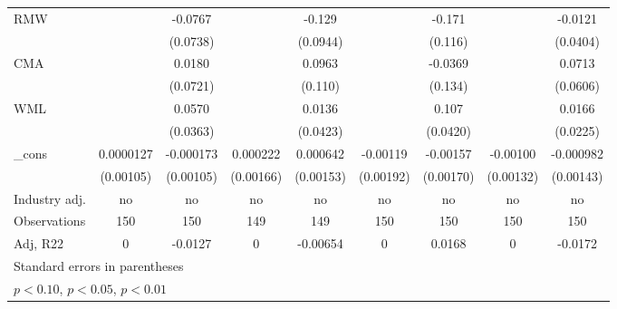 {\begin{tabular}{l*{8}{c}}
RMW                 &                     &     -0.0767         &                     &      -0.129         &                     &      -0.171         &                     &     -0.0121         \\
                    &                     &    (0.0738)         &                     &    (0.0944)         &                     &     (0.116)         &                     &    (0.0404)         \\
CMA                 &                     &      0.0180         &                     &      0.0963         &                     &     -0.0369         &                     &      0.0713         \\
                    &                     &    (0.0721)         &                     &     (0.110)         &                     &     (0.134)         &                     &    (0.0606)         \\
WML                 &                     &      0.0570         &                     &      0.0136         &                     &       0.107\sym{**} &                     &      0.0166         \\
                    &                     &    (0.0363)         &                     &    (0.0423)         &                     &    (0.0420)         &                     &    (0.0225)         \\
\_cons              &   0.0000127         &   -0.000173         &    0.000222         &    0.000642         &    -0.00119         &    -0.00157         &    -0.00100         &   -0.000982         \\
                    &   (0.00105)         &   (0.00105)         &   (0.00166)         &   (0.00153)         &   (0.00192)         &   (0.00170)         &   (0.00132)         &   (0.00143)         \\
\hline
Industry adj.       &          no         &          no         &          no         &          no         &          no         &          no         &          no         &          no         \\
Observations        &         150         &         150         &         149         &         149         &         150         &         150         &         150         &         150         \\
Adj, R22            &           0         &     -0.0127         &           0         &    -0.00654         &           0         &      0.0168         &           0         &     -0.0172         \\
\hline\hline
\multicolumn{9}{l}{\footnotesize Standard errors in parentheses}\\
\multicolumn{9}{l}{\footnotesize \sym{*} \(p<0.10\), \sym{**} \(p<0.05\), \sym{***} \(p<0.01\)}\\
\end{tabular}
}
